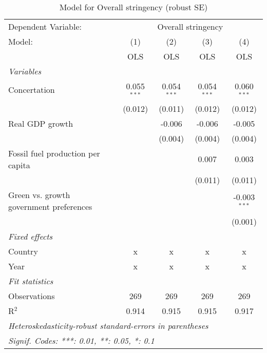 
\begin{table}[htbp]
   \caption{Model for Overall stringency (robust SE)}
   \centering
   \begin{tabular}{lcccc}
      \toprule
      Dependent Variable: & \multicolumn{4}{c}{Overall stringency}\\
      Model:                                  & (1)           & (2)           & (3)           & (4)\\  
                                              &  OLS          & OLS           & OLS           & OLS\\  
      \midrule
      \emph{Variables}\\
      Concertation                            & 0.055$^{***}$ & 0.054$^{***}$ & 0.054$^{***}$ & 0.060$^{***}$\\   
                                              & (0.012)       & (0.011)       & (0.012)       & (0.012)\\   
      Real GDP growth                         &               & -0.006        & -0.006        & -0.005\\   
                                              &               & (0.004)       & (0.004)       & (0.004)\\   
      Fossil fuel production per capita       &               &               & 0.007         & 0.003\\   
                                              &               &               & (0.011)       & (0.011)\\   
      Green vs. growth government preferences &               &               &               & -0.003$^{***}$\\   
                                              &               &               &               & (0.001)\\   
      \emph{Fixed effects}\\
      Country                                 & x             & x             & x             & x\\  
      Year                                    & x             & x             & x             & x\\  
      \midrule \emph{Fit statistics}\\
      Observations                            & 269           & 269           & 269           & 269\\  
      R$^2$                                   & 0.914         & 0.915         & 0.915         & 0.917\\  
      \midrule
      \multicolumn{5}{l}{\emph{Heteroskedasticity-robust standard-errors in parentheses}}\\
      \multicolumn{5}{l}{\emph{Signif. Codes: ***: 0.01, **: 0.05, *: 0.1}}\\
   \end{tabular}
\end{table}


